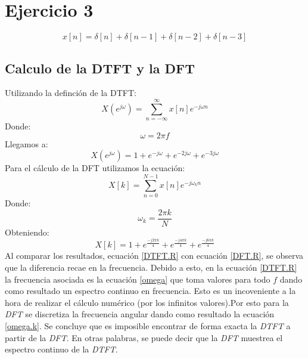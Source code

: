 \documentclass[letterpaper]{article}
\begin{document}
    \section{Ejercicio 3}

    \begin{equation}
        x[n]=\delta[n]+\delta[n-1]+\delta[n-2]+\delta[n-3]
    \end{equation}

    \subsection{Calculo de la DTFT y la DFT}

    Utilizando la definción de la DTFT:
    \begin{equation}
        X(e^{j\omega})=\sum_{n=-\infty}^{\infty}x[n]e^{-j\omega n}
    \end{equation}
    Donde:
    \begin{equation}
        \label{omega}
        \omega=2\pi f
    \end{equation}
    Llegamos a:
    \begin{equation}
        \label{DTFT.R}
        X(e^{j\omega})=1+e^{-j\omega}+e^{-2j\omega}+e^{-3j\omega}
    \end{equation}
    Para el cálculo de la DFT utilizamos la ecuación:
    \begin{equation}
        X[k]=\sum_{n=0}^{N-1}x[n]e^{-j\omega_k n}
    \end{equation}
    Donde:
    \begin{equation}
        \label{omega.k}
        \omega_k=\frac{2\pi k}{N}
    \end{equation}
    Obteniendo:
    \begin{equation}
        \label{DFT.R}
        X[k]=1+e^{\frac{-j2\pi k }{4}}+e^{\frac{-j4\pi k}{4}}+e^{\frac{-j6\pi k}{4}}
    \end{equation}
    Al comparar los resultados, ecuación \ref{DTFT.R} con ecuación \ref{DFT.R}, se observa que la diferencia recae en la frecuencia. Debido a esto, en la ecuación 
    \ref{DTFT.R} la frecuencia asociada es la ecuación \ref{omega} que toma valores para todo $f$ dando como resultado un espectro continuo en frecuencia. Esto es un incoveniente a la hora 
    de realizar el cálculo numérico (por los infinitos valores).Por esto para la \textit{DFT} se discretiza la frecuencia angular dando como resultado la ecuación \ref{omega.k}. Se concluye que es imposible encontrar de forma exacta la \textit{DTFT} a partir de la \textit{DFT}. En otras palabras, se puede decir que 
    la \textit{DFT} muestrea el espectro continuo de la \textit{DTFT}.
\end{document}
